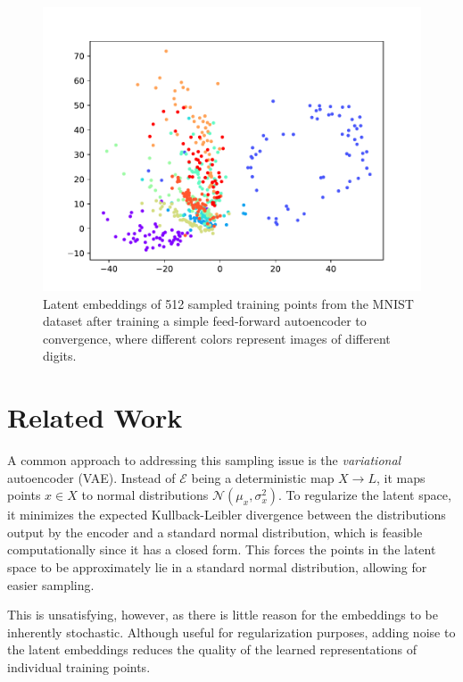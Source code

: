 \documentclass[conference]{IEEEtran}
\begin{document}
\begin{figure}[H]
	\centering
	\includegraphics[scale=0.5]{fig/bad-latent.pdf}
	\caption{Latent embeddings of 512 sampled training points from the MNIST dataset after training a simple feed-forward autoencoder to convergence, where different colors represent images of different digits.}
	\label{bad-latent}
\end{figure}

\section{Related Work}

A common approach to addressing this sampling issue is the \textit{variational} autoencoder (VAE). Instead of $\mathcal{E}$ being a deterministic map $X\to L$, it maps points $x \in X$ to normal distributions $\mathcal{N}(\mu_{x}, \sigma^{2}_{x})$. To regularize the latent space, it minimizes the expected Kullback-Leibler divergence between the distributions output by the encoder and a standard normal distribution, which is feasible computationally since it has a closed form\cite{vae}. This forces the points in the latent space to be approximately lie in a standard normal distribution, allowing for easier sampling.

This is unsatisfying, however, as there is little reason for the embeddings to be inherently stochastic. Although useful for regularization purposes, adding noise to the latent embeddings reduces the quality of the learned representations of individual training points.
\end{document}
